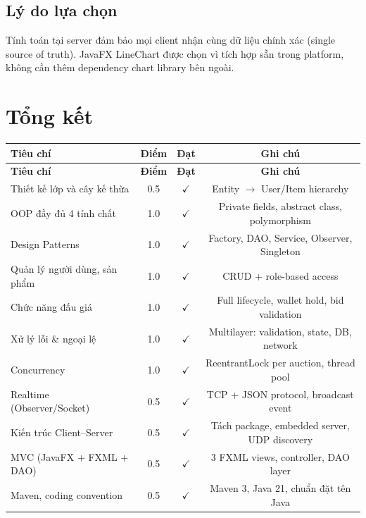 \documentclass[12pt,a4paper]{article}
\begin{document}
\subsection*{Lý do lựa chọn}
Tính toán tại server đảm bảo mọi client nhận cùng dữ liệu chính xác (single source of truth). JavaFX LineChart được chọn vì tích hợp sẵn trong platform, không cần thêm dependency chart library bên ngoài.

\newpage
\section*{Tổng kết}

\begin{longtable}{@{}p{7cm}ccc@{}}
  \toprule
  \textbf{Tiêu chí} & \textbf{Điểm} & \textbf{Đạt} & \textbf{Ghi chú} \\
  \midrule
  \endfirsthead
  \toprule
  \textbf{Tiêu chí} & \textbf{Điểm} & \textbf{Đạt} & \textbf{Ghi chú} \\
  \midrule
  \endhead
  Thiết kế lớp và cây kế thừa       & 0.5 & $\checkmark$ & Entity $\to$ User/Item hierarchy \\
  OOP đầy đủ 4 tính chất             & 1.0 & $\checkmark$ & Private fields, abstract class, polymorphism \\
  Design Patterns                    & 1.0 & $\checkmark$ & Factory, DAO, Service, Observer, Singleton \\
  Quản lý người dùng, sản phẩm      & 1.0 & $\checkmark$ & CRUD + role-based access \\
  Chức năng đấu giá                  & 1.0 & $\checkmark$ & Full lifecycle, wallet hold, bid validation \\
  Xử lý lỗi \& ngoại lệ             & 1.0 & $\checkmark$ & Multilayer: validation, state, DB, network \\
  Concurrency                        & 1.0 & $\checkmark$ & ReentrantLock per auction, thread pool \\
  Realtime (Observer/Socket)         & 0.5 & $\checkmark$ & TCP + JSON protocol, broadcast event \\
  Kiến trúc Client–Server            & 0.5 & $\checkmark$ & Tách package, embedded server, UDP discovery \\
  MVC (JavaFX + FXML + DAO)          & 0.5 & $\checkmark$ & 3 FXML views, controller, DAO layer \\
  Maven, coding convention           & 0.5 & $\checkmark$ & Maven 3, Java 21, chuẩn đặt tên Java \\

\end{longtable}
\end{document}
